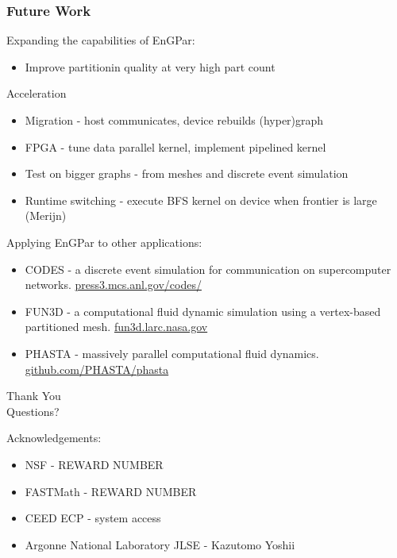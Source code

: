 \documentclass{beamer}
\begin{document}
\begin{frame}
  \frametitle{Future Work}
  Expanding the capabilities of EnGPar:
  \begin{itemize}
    \item Improve partitionin quality at very high part count
  \end{itemize}
  Acceleration
  \begin{itemize}
    \item Migration - host communicates, device rebuilds (hyper)graph
    \item FPGA - tune data parallel kernel, implement pipelined kernel
    \item Test on bigger graphs - from meshes and discrete event simulation
    \item Runtime switching - execute BFS kernel on device when frontier is large (Merijn)
  \end{itemize}
  Applying EnGPar to other applications:
  \begin{itemize}
    \item CODES - a discrete event simulation for communication on supercomputer networks. \url{press3.mcs.anl.gov/codes/}
    \item FUN3D - a computational fluid dynamic simulation using a vertex-based partitioned mesh. \url{fun3d.larc.nasa.gov}
    \item PHASTA - massively parallel computational fluid dynamics. \url{github.com/PHASTA/phasta}
  \end{itemize}
\end{frame}

\begin{frame}
  \begin{center}
    {\huge
      Thank You\\
      \bigskip
      \bigskip
      \bigskip
      \bigskip
      \bigskip
      \huge
      Questions?\\
      \bigskip
      \bigskip
      \bigskip
    }
  \end{center}
  \large
  Acknowledgements:\\
  \begin{itemize}
    \item NSF - REWARD NUMBER
    \item FASTMath - REWARD NUMBER
    \item CEED ECP - system access
    \item Argonne National Laboratory JLSE - Kazutomo Yoshii
  \end{itemize}
\end{frame}
\end{document}
